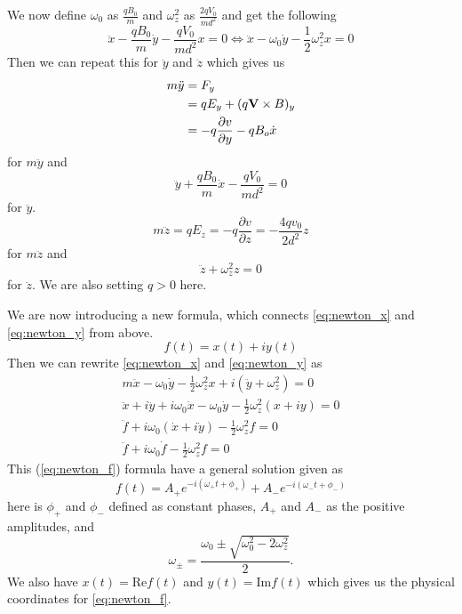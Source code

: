 \documentclass[english,notitlepage,reprint,nofootinbib]{revtex4-1}  %
\begin{document}
	We now define $\omega_0$ as $\frac{q B_0}{m}$ and $\omega_z^2$ as $\frac{2 q V_0}{md^2}$ and get the following
	\begin{equation} \label{eq:newton_x}
		\ddot{x} - \frac{q B_0}{m} \dot{y} - \frac{q V_0}{m d^2} x = 0 \Leftrightarrow \ddot{x} - \omega_0 \dot{y} - \frac{1}{2} \omega^2_z x = 0
	\end{equation}
	Then we can repeat this for $\ddot{y}$ and $\ddot{z}$ which gives us
	\begin{align*}
		m \ddot{y} &= F_y \\
		&= q E_y + (q \vectorbold{V} \times B)_y \\
		&= - q \frac{\partial v}{\partial y} - q B_o \dot{x}
	\end{align*}
	for $m \ddot{y}$ and 
	\begin{equation} \label{eq:newton_y}
		\ddot{y} + \frac{q B_0}{m} \dot{x} - \frac{q V_0}{m d^2} = 0
	\end{equation}
	for $\ddot{y}$.
	\begin{equation*}
		m \ddot{z} = q E_z = -q \frac{\partial v}{\partial z} = - \frac{4 q v_0}{2 d^2} z
	\end{equation*}
	for $m \ddot{z}$ and
	\begin{equation} \label{eq:newton_z}
		\ddot{z} + \omega^2_z z = 0
	\end{equation}
	for $\ddot{z}$. We are also setting $q > 0$ here.

	We are now introducing a new formula, which connects \ref{eq:newton_x} and \ref{eq:newton_y} from above.
	\begin{equation*}
		f(t) = x(t) + iy(t)
	\end{equation*}
	Then we can rewrite \ref{eq:newton_x} and \ref{eq:newton_y} as
	\begin{align} \label{eq:newton_f}
		m \ddot{x} - \omega_0 \dot{y} - \frac{1}{2} \omega_z^2 x + i(\ddot{y} + \omega_z^2) = 0 \nonumber \\
		\ddot{x} + i \ddot{y} + i \omega_0 \dot{x} - \omega_0 \dot{y} - \frac{1}{2} \omega_z^2 (x + iy) = 0 \nonumber \\
		\ddot{f} + i \omega_0 (\dot{x} + i \dot{y}) - \frac{1}{2} \omega_z^2 f = 0 \nonumber \\
		\ddot{f} + i \omega_0 \dot{f} - \frac{1}{2} \omega_z^2 f = 0
	\end{align}
	This (\ref{eq:newton_f}) formula have a general solution given as
	\begin{equation} \label{eq:gen_sol}
		f(t) = A_+ e^{-i(\omega_+ t + \phi_+)} + A_- e^{-i(\omega_- t + \phi_-)}
	\end{equation}
	here is $\phi_+$ and $\phi_-$ defined as constant phases, $A_+$ and $A_-$ as the positive amplitudes, and 
	\begin{equation*}
		\omega_\pm = \frac{\omega_0 \pm \sqrt{\omega_0^2 - 2\omega_z^2}}{2}.
	\end{equation*}
	We also have $x(t) = \text{Re} f(t)$ and $y(t) = \text{Im} f(t)$ which gives us the physical coordinates for \ref{eq:newton_f}.
	
\end{document}
